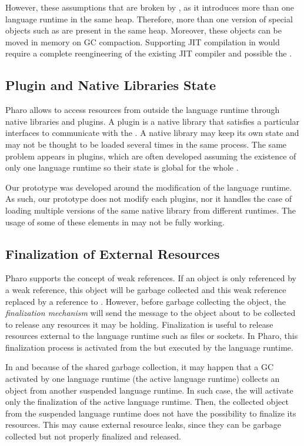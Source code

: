 However, these assumptions that are broken by \Vtt, as it introduces more than one language runtime in the same heap. Therefore, more than one version of special objects such as  are present in the same heap. Moreover, these objects can be moved in memory on GC compaction. Supporting JIT compilation in \Vtt would require a complete reengineering of the existing JIT compiler and possible the \VM.

\subsection{Plugin and Native Libraries State}

Pharo \VM allows to access resources from outside the language runtime through native libraries and \VM plugins. A \VM plugin is a native library that satisfies a particular interfaces to communicate with the \VM. A native library may keep its own state and may not be thought to be loaded several times in the same process. The same problem appears in \VM plugins, which are often developed assuming the existence of only one language runtime so their state is global for the whole \VM.

Our prototype was developed around the modification of the language runtime. As such, our \Vtt prototype does not modify each \VM plugins, nor it handles the case of loading multiple versions of the same native library from different runtimes. The usage of some of these elements in \Vtt may not be fully working.

\subsection{Finalization of External Resources}

Pharo \VM supports the concept of weak references. If an object is only referenced by a weak reference, this object will be garbage collected and this weak reference replaced by a reference to . However, before garbage collecting the object, the \emph{finalization mechanism} will send the  message to the object about to be collected to release any resources it may be holding. Finalization is useful to release resources external to the language runtime such as files or sockets. In Pharo, this finalization process is activated from the \VM but executed by the language runtime.

In \Vtt and because of the shared garbage collection, it may happen that a GC activated by one language runtime (the active language runtime) collects an object from another suspended language runtime. In such case, the \VM will activate only the finalization of the active language runtime. Then, the collected object from the suspended language runtime does not have the possibility to finalize its resources. This may cause external resource leaks, since they can be garbage collected but not properly finalized and released.

